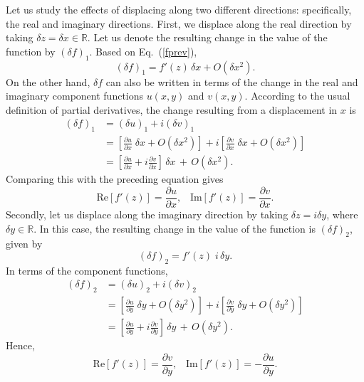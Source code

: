 \documentclass[10pt,a4paper]{article}
\begin{document}
Let us study the effects of displacing along two different directions:
specifically, the real and imaginary directions. First, we displace
along the real direction by taking $\delta z = \delta x \in
\mathbb{R}$. Let us denote the resulting change in the value of the
function by $(\delta f)_1$. Based on Eq.~(\ref{fprev}),
\begin{equation}
(\delta f)_1 = f'(z) \, \delta x + O(\delta x^2).
\end{equation}
On the other hand, $\delta f$ can also be written in terms of the
change in the real and imaginary component functions $u(x,y)$ and
$v(x,y)$. According to the usual definition of partial derivatives,
the change resulting from a displacement in $x$ is
\begin{align}
  (\delta f)_1 &= (\delta u)_1 + i (\delta v)_1 \\
  &= \left[\frac{\partial u}{\partial x}\; \delta x + O(\delta x^2)\right]
  + i \left[\frac{\partial v}{\partial x} \;\delta x+ O(\delta x^2)\right] \\
  &= \left[\frac{\partial u}{\partial x} + i \frac{\partial v}{\partial x}\right]
  \,\delta x\, +\, O(\delta x^2).
\end{align}
Comparing this with the preceding equation gives
\begin{equation}
  \mathrm{Re}\left[f'(z)\right] = \frac{\partial u}{\partial x},\;\;\;
  \mathrm{Im}\left[f'(z)\right] = \frac{\partial v}{\partial x}.
  \label{cauchyproof1}
\end{equation}
Secondly, let us displace along the imaginary direction by taking
$\delta z = i \delta y$, where $\delta y \in \mathbb{R}$. In this
case, the resulting change in the value of the function is $(\delta
f)_2$, given by
\begin{equation}
  (\delta f)_2 = f'(z) \;i\, \delta y.
\end{equation}
In terms of the component functions,
\begin{align}
  (\delta f)_2 &= (\delta u)_2 + i (\delta v)_2 \\
  &= \left[\frac{\partial u}{\partial y}\; \delta y + O(\delta y^2)\right]
  + i \left[\frac{\partial v}{\partial y} \;\delta y+ O(\delta y^2)\right] \\
  &= \left[\frac{\partial u}{\partial y} + i \frac{\partial v}{\partial y}\right]
  \,\delta y\, +\, O(\delta y^2).
\end{align}
Hence,
\begin{equation}
  \mathrm{Re}\left[f'(z)\right] = \frac{\partial v}{\partial y},\;\;\;
  \mathrm{Im}\left[f'(z)\right] = -\frac{\partial u}{\partial y}.
  \label{cauchyproof2}
\end{equation}
\end{document}
